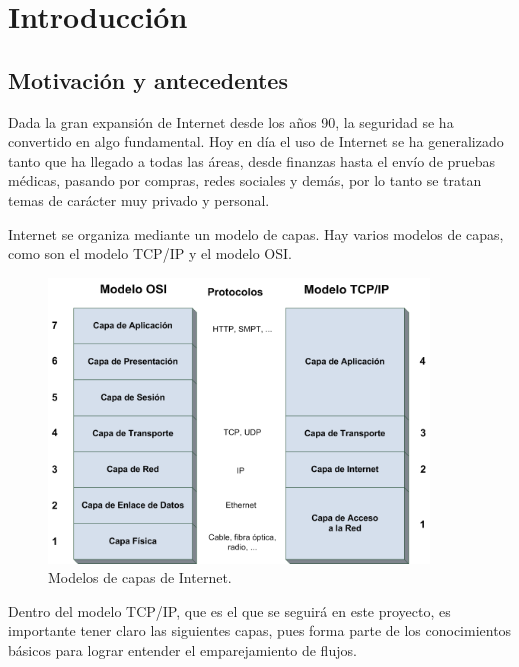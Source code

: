 \chapter{Introducción}

\section{Motivación y antecedentes}

Dada la gran expansión de Internet desde los años 90, la seguridad se ha convertido en algo 
fundamental. Hoy en día el uso de Internet se ha generalizado tanto que ha llegado a todas las áreas, 
desde finanzas hasta el envío de pruebas médicas, pasando por compras, redes sociales y demás, por lo tanto 
se tratan temas de carácter muy privado y personal.

\intro Internet se organiza mediante un modelo de capas. Hay varios modelos de capas, como son el modelo TCP/IP y el modelo OSI. \cite{redes2010}

\begin{figure}[H]
  \includegraphics[width=0.9\textwidth]{imagenes/capas.png}
  \centering
  \caption{Modelos de capas de Internet.}
\end{figure}

\intro Dentro del modelo TCP/IP, que es el que se seguirá en este proyecto, es importante tener claro las siguientes 
capas, pues forma parte de los conocimientos básicos para lograr entender el emparejamiento de flujos.

